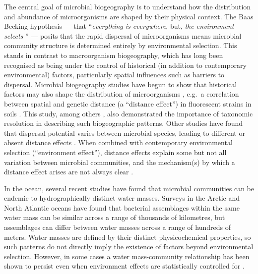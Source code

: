 The central goal of microbial biogeography is to understand how the distribution and abundance of microorganisms are shaped by their physical context.
The Baas Becking hypothesis --- that ``\textit{everything is everywhere}, but, \textit{the environment selects} \cite{Becking:1934um, deWit:2006de}'' --- posits that the rapid dispersal of microorganisms means microbial community structure is determined entirely by environmental selection.
This stands in contrast to macroorganism biogeography, which has long been recognised as being under the control of historical (in addition to contemporary environmental) factors, particularly spatial influences such as barriers to dispersal.
Microbial biogeography studies have begun to show that historical factors may also shape the distribution of microorganisms \cite{Martiny:2006jy}, e.g.\ a correlation between spatial and genetic distance (a ``distance effect'') in fluorescent  strains in soils \cite{Cho:2000tn}.
This study, among others \cite{Ramette:2007bb,Storch:2008tq}, also demonstrated the importance of taxonomic resolution in describing such biogeographic patterns.
Other studies have found that dispersal potential varies between microbial species, leading to different or absent distance effects \cite{Bissett:2010wj}.
When combined with contemporary environmental selection (``environment effect''), distance effects explain some but not all variation between microbial communities, and the mechanism(s) by which a distance effect arises are not always clear \cite{Hanson:2012cb}.

In the ocean, several recent studies have found that microbial communities can be endemic to hydrographically distinct water masses.
Surveys in the Arctic \cite{Galand:2009hy} and North Atlantic \cite{Agogue:2011fm} oceans have found that bacterial assemblages within the same water mass can be similar across a range of thousands of kilometres, but assemblages can differ between water masses across a range of hundreds of meters.
Water masses are defined by their distinct physicochemical properties, so such patterns do not directly imply the existence of factors beyond environmental selection.
However, in some cases a water mass-community relationship has been shown to persist even when environment effects are statistically controlled for \cite{Hamilton:2008tp, Hamdan:2013ko}.

